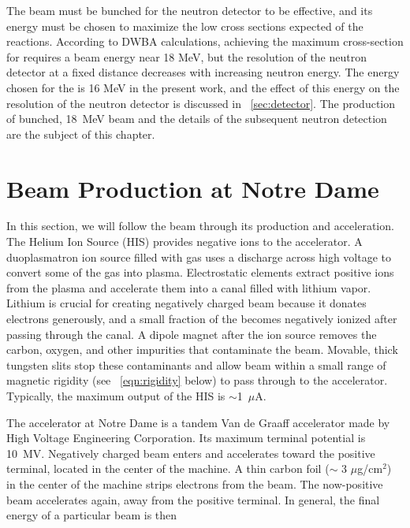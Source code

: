 
The beam must be bunched for the neutron detector to be effective, and its energy must be chosen to maximize the low cross sections expected of the \reaction reactions.  According to DWBA calculations, achieving the maximum \zp cross-section for \reaction requires a beam energy near 18 MeV, but the resolution of the neutron detector at a fixed distance decreases with increasing neutron energy.  The energy chosen for the  is 16 MeV in the present work, and the effect of this energy on the resolution of the neutron detector is discussed in {\sect}~\ref{sec:detector}.  The production of bunched, 18~MeV  beam and the details of the subsequent neutron detection are the subject of this chapter.



\section{Beam Production at Notre Dame}
\label{sec:beamProduction}

In this section, we will follow the beam through its production and acceleration.  The Helium Ion Source (HIS) provides negative  ions to the accelerator.  A duoplasmatron ion source filled with  gas uses a discharge across high voltage to convert some of the gas into plasma.  Electrostatic elements extract positive  ions from the plasma and accelerate them into a canal filled with lithium vapor.  Lithium is crucial for creating negatively charged beam because it donates electrons generously, and a small fraction of the  becomes negatively ionized after passing through the canal.  A dipole magnet after the ion source removes the carbon, oxygen, and other impurities that contaminate the  beam.  Movable, thick tungsten slits stop these contaminants and allow beam within a small range of magnetic rigidity (see {\eqn}~\ref{eqn:rigidity} below) to pass through to the accelerator.  Typically, the maximum output of the HIS is $\sim$1~$\mu$A.

The accelerator at Notre Dame is a tandem Van de Graaff accelerator made by High Voltage Engineering Corporation.  Its maximum terminal potential is 10~MV.  Negatively charged beam enters and accelerates toward the positive terminal, located in the center of the machine. A thin carbon foil ($\sim$ 3 $\mu$g/cm$^2$) in the center of the machine strips electrons from the beam.  The now-positive beam accelerates again, away from the positive terminal. In general, the final energy of a particular beam is then

